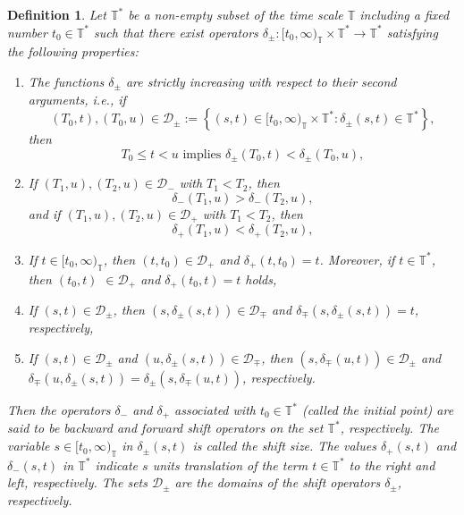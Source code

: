 \documentclass[b5paper,reqno]{amsart}\usepackage{amsfonts}
\theoremstyle{plain}
\newtheorem{definition}{Definition}
\numberwithin{equation}{section}
\begin{document}
\begin{definition}
\label{shift} Let $\mathbb{T}^{\ast}$ be a non-empty subset of the time scale
$\mathbb{T}$ including a fixed number $t_{0}\in\mathbb{T}^{\ast}$ such that
there exist operators $\delta_{\pm}:[t_{0},\infty)_{\mathbb{T}}\times
\mathbb{T}^{\ast}\rightarrow\mathbb{T}^{\ast}$ satisfying the following properties:

\begin{enumerate}
\item[P.1] The functions $\delta_{\pm}$ are strictly increasing with respect
to their second arguments, i.e., if
\[
(T_{0},t),(T_{0},u)\in\mathcal{D}_{\pm}:=\left\{  (s,t)\in\lbrack t_{0},\infty)_{\mathbb{T}}\times\mathbb{T}^{\ast}:\delta_{\pm}(s,t)\in
\mathbb{T}^{\ast}\right\}  ,
\]
then
\[
T_{0}\leq t<u\text{ implies }\delta_{\pm}(T_{0},t)<\delta_{\pm}(T_{0},u),
\]

\item[P.2] If $(T_{1},u),(T_{2},u)\in\mathcal{D}_{-}$ with $T_{1}<T_{2}$, then\[
\delta_{-}(T_{1},u)>\delta_{-}(T_{2},u),
\]
and if $(T_{1},u),(T_{2},u)\in\mathcal{D}_{+}$ with $T_{1}<T_{2}$, then
\[
\delta_{+}(T_{1},u)<\delta_{+}(T_{2},u),
\]

\item[P.3] If $t\in\lbrack t_{0},\infty)_{\mathbb{T}}$, then $(t,t_{0})\in\mathcal{D}_{+}$ and $\delta_{+}(t,t_{0})=t$. Moreover, if $t\in
\mathbb{T}^{\ast}$, then $(t_{0},t)$ $\in\mathcal{D}_{+}$ and $\delta
_{+}(t_{0},t)=t$ holds,

\item[P.4] If $(s,t)\in\mathcal{D}_{\pm}$, then $(s,\delta_{\pm}(s,t))\in\mathcal{D}_{\mp}$ and $\delta_{\mp}(s,\delta_{\pm}(s,t))=t$, respectively,

\item[P.5] If $(s,t)\in\mathcal{D}_{\pm}$ and $(u,\delta_{\pm}(s,t))\in
\mathcal{D}_{\mp}$, then $(s,\delta_{\mp}(u,t))\in\mathcal{D}_{\pm}$ and
$\delta_{\mp}(u,\delta_{\pm}(s,t))=\delta_{\pm}(s,\delta_{\mp}(u,t))$, respectively.
\end{enumerate}

\noindent Then the operators $\delta_{-}$ and $\delta_{+}$ associated with
$t_{0}\in\mathbb{T}^{\ast}$ (called the initial point) are said to be
\textit{backward and forward shift operators} on the set $\mathbb{T}^{\ast}$,
respectively. The variable $s\in\lbrack t_{0},\infty)_{\mathbb{T}}$ in
$\delta_{\pm}(s,t)$ is called the shift size. The values $\delta_{+}(s,t)$ and
$\delta_{-}(s,t)$ in $\mathbb{T}^{\ast}$ indicate $s$ units translation of the
term $t\in\mathbb{T}^{\ast}$ to the right and left, respectively. The sets
$\mathcal{D}_{\pm}$ are the domains of the shift operators $\delta_{\pm}$, respectively.
\end{definition}
\end{document}
